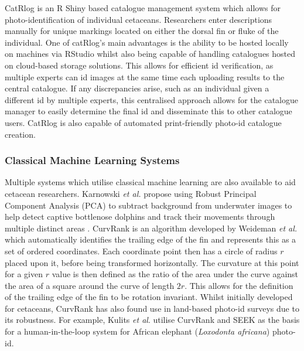 CatRlog \cite{keen_catrlog_2021} is an R Shiny based catalogue management system which allows for photo-identification of individual cetaceans. Researchers enter descriptions manually for unique markings located on either the dorsal fin or fluke of the individual. One of catRlog's main advantages is the ability to be hosted locally on machines via RStudio whilst also being capable of handling catalogues hosted on cloud-based storage solutions. This allows for efficient id verification, as multiple experts can id images at the same time each uploading results to the central catalogue. If any discrepancies arise, such as an individual given a different id by multiple experts, this centralised approach allows for the catalogue manager to easily determine the final id and disseminate this to other catalogue users. CatRlog is also capable of automated print-friendly photo-id catalogue creation. 

\subsubsection{Classical Machine Learning Systems}\label{ch:Background,sec:conTech,sub:photoIDAides,subsub:nonDL}

Multiple systems which utilise classical machine learning are also available to aid cetacean researchers. Karnowski \textit{et al.} propose using Robust Principal Component Analysis (PCA) to subtract background from underwater images to help detect captive bottlenose dolphins and track their movements through multiple distinct areas \cite{karnowski_dolphin_2015}. CurvRank is an algorithm developed by Weideman \textit{et al.} \cite{weideman_integral_2017} which automatically identifies the trailing edge of the fin and represents this as a set of ordered coordinates. Each coordinate point then has a circle of radius $r$ placed upon it, before being transformed horizontally. The curvature at this point for a given $r$ value is then defined as the ratio of the area under the curve against the area of a square around the curve of length $2r$. This allows for the definition of the trailing edge of the fin to be rotation invariant. Whilst initially developed for cetaceans, CurvRank has also found use in land-based photo-id surveys due to its robustness. For example, Kulits \textit{et al}. \cite{kulits_elephantbook_2021} utilise CurvRank and SEEK \cite{bedetti_system_2020} as the basis for a human-in-the-loop system for African elephant (\textit{Loxodonta africana}) photo-id. 

